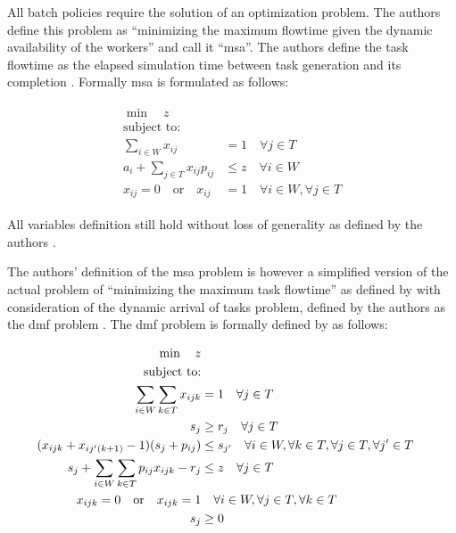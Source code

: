 All batch policies require the solution of an optimization problem. The authors define this problem as ``minimizing the maximum flowtime given the dynamic availability of the workers'' and call it ``\gls{msa}''\citep[p. 7]{Zeng2005}. The authors define the task flowtime as the elapsed simulation time between task generation and its completion \citep{Zeng2005,Baker1974}. Formally \gls{msa} is formulated as follows:

\begin{align}
	\begin{split}
	    \min \quad z\\
	    \text{subject to:} \\
	    \sum_{i \in W} x_{ij} &= 1 \quad \forall j \in T\\
	    a_i + \sum_{j \in T} x_{ij} p_{ij} &\leq z \quad \forall i \in W\\
	    x_{ij}=0 \quad \text{or} \quad x_{ij}&=1 \quad \forall i \in W, \forall j \in T
	\end{split}
\end{align}

All variables definition still hold without loss of generality as defined by the authors \citep[pp. 5--7]{Zeng2005}.

The authors' definition of the \gls{msa} problem is however a simplified version of the actual problem of ``minimizing the maximum task flowtime'' as defined by \citet{Baker1974} with consideration of the dynamic arrival of tasks problem, defined by the authors as the \gls{dmf} problem \citep{Zeng2005}. The \gls{dmf} problem is formally defined by \citet{Zeng2005} as follows:

\begin{align}
    \min \quad z \notag \\
    \text{subject to:} \notag \\
    \sum_{i \in W} \sum_{k \in T} x_{ijk} &= 1 \quad \forall j \in T \notag \\
    s_j &\geq r_j \quad \forall j \in T \notag \\
    (x_{ijk} + x_{ij'(k+1)} - 1)(s_j + p_{ij}) &\leq s_{j'} \quad \forall i \in W, \forall k \in T, \forall j \in T, \forall j' \in T \label{eq:nonlinear_constraints_dmf}\\
    s_j + \sum_{i \in W} \sum_{k \in T} p_{ij} x_{ijk} - r_j &\leq z \quad \forall j \in T \notag \\
    x_{ijk} = 0 \quad \text{or} \quad x_{ijk} = 1 &\quad \forall i \in W, \forall j \in T, \forall k \in T \notag \\
    s_j &\geq 0 \notag 
\end{align}

